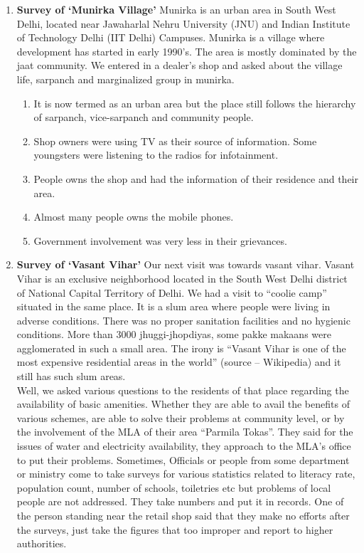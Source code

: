 \begin{enumerate}
\item \textbf {Survey of ‘Munirka Village’}
Munirka is an urban area in South West Delhi, located near Jawaharlal Nehru
University (JNU) and Indian Institute of Technology Delhi (IIT Delhi)
Campuses. Munirka is a village where development has started in early 1990’s.
The area is mostly dominated by the jaat community. We entered in a dealer’s shop
and asked about the village life, sarpanch and marginalized group in munirka.

\begin{enumerate}
\item It is now termed as an urban area but the place still follows the hierarchy of
sarpanch, vice-sarpanch and community people.
\item Shop owners were using TV as their source of information. Some youngsters
were listening to the radios for infotainment.
\item People owns the shop and had the information of their residence and their
area.
\item Almost many people owns the mobile phones.
\item Government involvement was very less in their grievances.
\end{enumerate}

\item \textbf {Survey of ‘Vasant Vihar’}
Our next visit was towards vasant vihar. Vasant Vihar is an exclusive
neighborhood located in the South West Delhi district of National Capital Territory
of Delhi. We had a visit to “coolie camp” situated in the same place. It is a slum area
where people were living in adverse conditions. There was no proper sanitation
facilities and no hygienic conditions. More than 3000 jhuggi-jhopdiyas, some pakke
makaans were agglomerated in such a small area. The irony is “Vasant Vihar is one
of the most expensive residential areas in the world” (source – Wikipedia) and it
still has such slum areas.\\
Well, we asked various questions to the residents of that place regarding the
availability of basic amenities. Whether they are able to avail the benefits of various
schemes, are able to solve their problems at community level, or by the involvement
of the MLA of their area “Parmila Tokas”. They said for the issues of water and
electricity availability, they approach to the MLA’s office to put their problems.
Sometimes, Officials or people from some department or ministry come to take
surveys for various statistics related to literacy rate, population count, number of
schools, toiletries etc but problems of local people are not addressed. They take
numbers and put it in records. One of the person standing near the retail shop said
that they make no efforts after the surveys, just take the figures that too improper
and report to higher authorities.


\end{enumerate}
